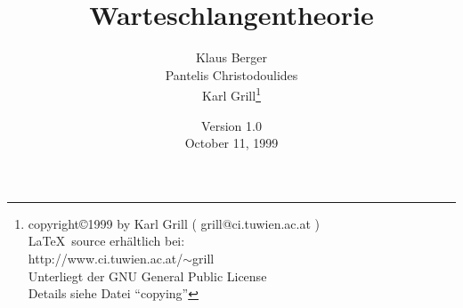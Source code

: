 \documentclass[12pt,german,makeidx,oneside]{book}
\date{Version 1.0\\October 11, 1999}
\author{Klaus Berger \\
Pantelis Christodoulides \\
Karl Grill\thanks{ copyright\copyright 1999 by Karl Grill
( grill@ci.tuwien.ac.at )
\protect\\ \LaTeX\ source erhältlich bei:
\protect\\ http://www.ci.tuwien.ac.at/$\sim$grill
\protect\\ Unterliegt der GNU General Public License
\protect\\ Details siehe Datei \enquote{copying}}}
\begin{document}
\title{Warteschlangentheorie}
\maketitle
\tableofcontents


\printindex
\end{document}
